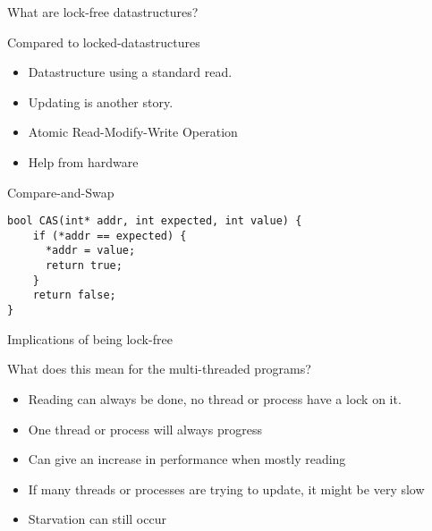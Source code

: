 \begin{frame}{What are lock-free datastructures?}
	\begin{block}{Compared to locked-datastructures}
		\begin{itemize}
			\item Datastructure using a standard \textcolor{ReneOrange}{read}.
			\item \textcolor{ReneOrange}{Updating} is another story.
			\item Atomic Read-Modify-Write Operation
			\item Help from hardware
		\end{itemize}
	\end{block}

\begin{block}{Compare-and-Swap}
\begin{lstlisting}[style=customc]
bool CAS(int* addr, int expected, int value) {
	if (*addr == expected) {
	  *addr = value;
	  return true;
	}
	return false;
} 
\end{lstlisting}
\end{block}
\end{frame}

\begin{frame}{Implications of being lock-free}
	\begin{block}{What does this mean for the multi-threaded programs?}
		\begin{itemize}
			\item Reading can always be done, no thread or process have a \textcolor{ReneOrange}{lock} on it.
			\item One thread or process will always progress
			\item Can give an increase in performance when mostly reading
			\item If many threads or processes are trying to update, it might be very slow
			\item \textcolor{ReneOrange}{Starvation} can still occur
		\end{itemize}
	\end{block}
\end{frame}